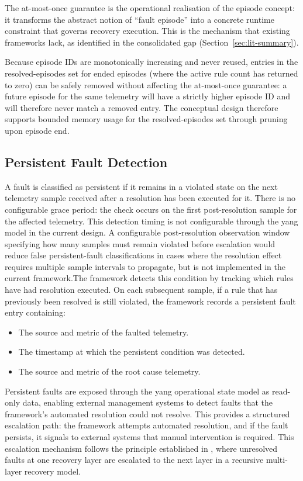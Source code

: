 The at-most-once guarantee is the operational realisation of the episode concept: it transforms the abstract notion of ``fault episode'' into a concrete runtime constraint that governs recovery execution. This is the mechanism that existing frameworks lack, as identified in the consolidated gap (Section~\ref{sec:lit-summary}).

Because episode IDs are monotonically increasing and never reused, entries in the resolved-episodes set for ended episodes (where the active rule count has returned to zero) can be safely removed without affecting the at-most-once guarantee: a future episode for the same telemetry will have a strictly higher episode ID and will therefore never match a removed entry. The conceptual design therefore supports bounded memory usage for the resolved-episodes set through pruning upon episode end.

\subsection{Persistent Fault Detection}\label{sec:persistent-fault-detection}

A fault is classified as persistent if it remains in a violated state on the next telemetry sample received after a resolution has been executed for it. There is no configurable grace period: the check occurs on the first post-resolution sample for the affected telemetry. This detection timing is not configurable through the \gls{yang} model in the current design. A configurable post-resolution observation window specifying how many samples must remain violated before escalation would reduce false persistent-fault classifications in cases where the resolution effect requires multiple sample intervals to propagate, but is not implemented in the current framework.The framework detects this condition by tracking which rules have had resolution executed. On each subsequent sample, if a rule that has previously been resolved is still violated, the framework records a persistent fault entry containing:

\begin{itemize}
\item The source and metric of the faulted telemetry.
\item The timestamp at which the persistent condition was detected.
\item The source and metric of the root cause telemetry.
\end{itemize}

Persistent faults are exposed through the \gls{yang} operational state model as read-only data, enabling external management systems to detect faults that the framework's automated resolution could not resolve. This provides a structured escalation path: the framework attempts automated resolution, and if the fault persists, it signals to external systems that manual intervention is required. This escalation mechanism follows the principle established in \cite{ref2}, where unresolved faults at one recovery layer are escalated to the next layer in a recursive multi-layer recovery model.

